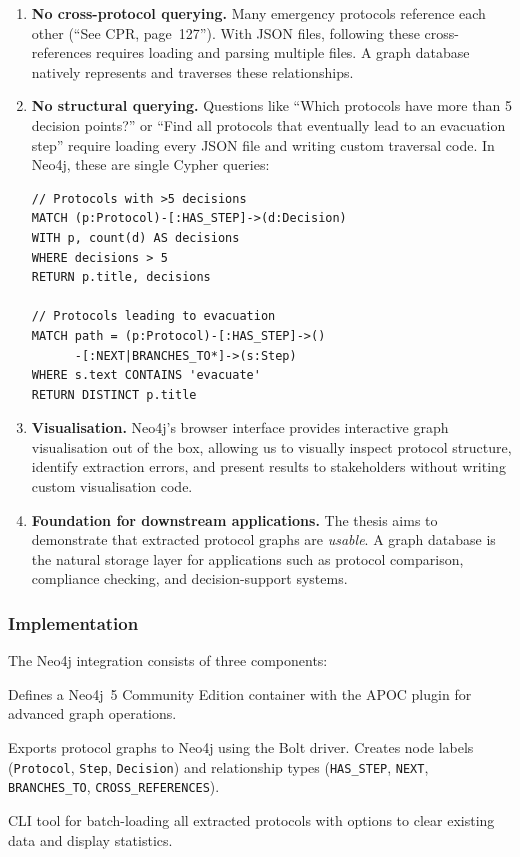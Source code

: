 \documentclass[12pt,a4paper]{article}
\begin{document}
\begin{enumerate}[leftmargin=2em]
    \item \textbf{No cross-protocol querying.} Many emergency protocols reference each other (``See CPR, page~127''). With JSON files, following these cross-references requires loading and parsing multiple files. A graph database natively represents and traverses these relationships.

    \item \textbf{No structural querying.} Questions like ``Which protocols have more than 5 decision points?'' or ``Find all protocols that eventually lead to an evacuation step'' require loading every JSON file and writing custom traversal code. In Neo4j, these are single Cypher queries:
    \begin{lstlisting}[language={}, basicstyle=\small\ttfamily]
// Protocols with >5 decisions
MATCH (p:Protocol)-[:HAS_STEP]->(d:Decision)
WITH p, count(d) AS decisions
WHERE decisions > 5
RETURN p.title, decisions

// Protocols leading to evacuation
MATCH path = (p:Protocol)-[:HAS_STEP]->()
      -[:NEXT|BRANCHES_TO*]->(s:Step)
WHERE s.text CONTAINS 'evacuate'
RETURN DISTINCT p.title
    \end{lstlisting}

    \item \textbf{Visualisation.} Neo4j's browser interface provides interactive graph visualisation out of the box, allowing us to visually inspect protocol structure, identify extraction errors, and present results to stakeholders without writing custom visualisation code.

    \item \textbf{Foundation for downstream applications.} The thesis aims to demonstrate that extracted protocol graphs are \emph{usable}. A graph database is the natural storage layer for applications such as protocol comparison, compliance checking, and decision-support systems.
\end{enumerate}

\subsubsection{Implementation}

The Neo4j integration consists of three components:
\begin{description}[leftmargin=2em]
    \item[\texttt{docker-compose.yml}:] Defines a Neo4j~5 Community Edition container with the APOC plugin for advanced graph operations.
    \item[\texttt{src/graph/neo4j\_export.py}:] Exports protocol graphs to Neo4j using the Bolt driver. Creates node labels (\texttt{Protocol}, \texttt{Step}, \texttt{Decision}) and relationship types (\texttt{HAS\_STEP}, \texttt{NEXT}, \texttt{BRANCHES\_TO}, \texttt{CROSS\_REFERENCES}).
    \item[\texttt{load\_neo4j.py}:] CLI tool for batch-loading all extracted protocols with options to clear existing data and display statistics.
\end{description}
\end{document}

